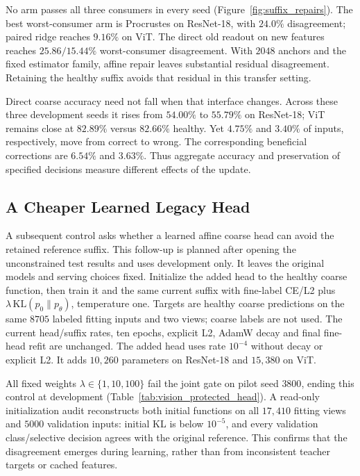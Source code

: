 No arm passes all three consumers in every seed (Figure~\ref{fig:suffix_repairs}).
The best worst-consumer arm is Procrustes on ResNet-18, with $24.0\%$
disagreement; paired ridge reaches $9.16\%$ on ViT. The direct old readout
on new features reaches $25.86/15.44\%$ worst-consumer disagreement.
With $2048$ anchors and the fixed estimator family, affine repair leaves
substantial residual disagreement. Retaining the healthy suffix avoids
that residual in this transfer setting.



Direct coarse accuracy need not fall when that interface changes. Across
these three development seeds it rises from $54.00\%$ to $55.79\%$ on
ResNet-18; ViT remains close at $82.89\%$ versus $82.66\%$ healthy. Yet
$4.75\%$ and $3.40\%$ of inputs, respectively, move from correct to wrong.
The corresponding beneficial corrections are $6.54\%$ and $3.63\%$.
Thus aggregate accuracy and preservation of specified decisions measure
different effects of the update.

\subsection{A Cheaper Learned Legacy Head}\label{app:vision_head_control}

A subsequent control asks whether a learned affine coarse head can avoid
the retained reference suffix. This follow-up is planned after opening
the unconstrained test results and uses development only. It leaves the original models and serving choices fixed. Initialize the added head to the
healthy coarse function, then train it and the same current suffix with
fine-label CE/L2 plus $\lambda\,\mathrm{KL}(p_0\|p_\theta)$, temperature one.
Targets are healthy coarse predictions on the same $8705$ labeled fitting
inputs and two views; coarse labels are not used. The current head/suffix
rates, ten epochs, explicit L2, AdamW decay and final fine-head refit are
unchanged. The added head uses rate $10^{-4}$ without decay or explicit L2.
It adds $10{,}260$ parameters on ResNet-18 and $15{,}380$ on ViT.



All fixed weights $\lambda\in\{1,10,100\}$ fail the joint gate on
pilot seed $3800$, ending this control at development
(Table~\ref{tab:vision_protected_head}). A read-only initialization
audit reconstructs both initial functions on all $17{,}410$ fitting views
and $5000$ validation inputs: initial KL is below $10^{-5}$, and every
validation class/selective decision agrees with the original reference.
This confirms that the disagreement emerges during learning, rather than
from inconsistent teacher targets or cached features.

